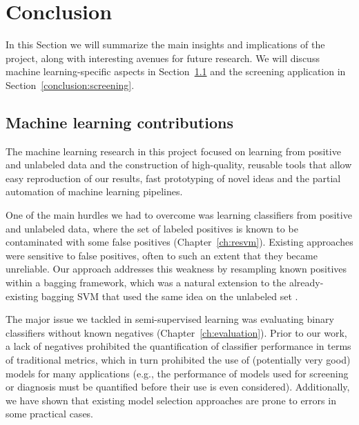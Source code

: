 \chapter{Conclusion}\label{ch:conclusion}

In this Section we will summarize the main insights and implications of the project, along with interesting avenues for future research. We will discuss machine learning-specific aspects in Section~\ref{conclusion:ml} and the screening application in Section~\ref{conclusion:screening}.


\section{Machine learning contributions} \label{conclusion:ml}
The machine learning research in this project focused on learning from positive and unlabeled data and the construction of high-quality, reusable tools that allow easy reproduction of our results, fast prototyping of novel ideas and the partial automation of machine learning pipelines.

One of the main hurdles we had to overcome was learning classifiers from positive and unlabeled data, where the set of labeled positives is known to be contaminated with some false positives (Chapter~\ref{ch:resvm}). Existing approaches were sensitive to false positives, often to such an extent that they became unreliable. Our approach addresses this weakness by resampling known positives within a bagging framework, which was a natural extension to the already-existing bagging SVM that used the same idea on the unlabeled set \citep{mordelet2014bagging}.

The major issue we tackled in semi-supervised learning was evaluating binary classifiers without known negatives (Chapter~\ref{ch:evaluation}). Prior to our work, a lack of negatives prohibited the quantification of classifier performance in terms of traditional metrics, which in turn prohibited the use of (potentially very good) models for many applications (e.g., the performance of models used for screening or diagnosis must be quantified before their use is even considered). Additionally, we have shown that existing model selection approaches are prone to errors in some practical cases. 


